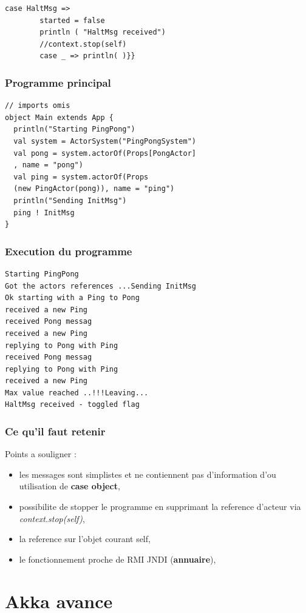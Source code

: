 \documentclass[xcolor=dvipsnames]{beamer}
\begin{document}
\begin{frame}[fragile]
 \lstset{frameround=fttt}
  \begin{lstlisting}[frame=trBL]
    case HaltMsg =>
        started = false
        println ( "HaltMsg received")
        //context.stop(self)
        case _ => println( )}}
  \end{lstlisting}
\end{frame}

\begin{frame}[fragile]
  \frametitle{Programme principal}
 \lstset{frameround=fttt}
  \begin{lstlisting}[frame=trBL]
// imports omis
object Main extends App {
  println("Starting PingPong")
  val system = ActorSystem("PingPongSystem")
  val pong = system.actorOf(Props[PongActor]
  , name = "pong")
  val ping = system.actorOf(Props
  (new PingActor(pong)), name = "ping")
  println("Sending InitMsg")
  ping ! InitMsg
}
\end{lstlisting}
\end{frame}

\begin{frame}[fragile]
  \frametitle{Execution du programme}
  \begin{lstlisting}[frame=trBL]
Starting PingPong
Got the actors references ...Sending InitMsg
Ok starting with a Ping to Pong
received a new Ping
received Pong messag
received a new Ping
replying to Pong with Ping
received Pong messag
replying to Pong with Ping
received a new Ping
Max value reached ..!!!Leaving...
HaltMsg received - toggled flag
\end{lstlisting}
\end{frame}

 \begin{frame}
   \frametitle{Ce qu'il faut retenir}
   Points a souligner :
   \begin{itemize}
   \item les messages sont simplistes et ne contiennent pas d'information d'ou utilisation de \textbf{case object},
   \item  possibilite de stopper le programme en supprimant la reference d'acteur via \textit{context.stop(self)},
   \item la reference sur l'objet courant self,
   \item le fonctionnement proche de RMI \/JNDI (\textbf{annuaire}),
   \end{itemize}
 \end{frame}

\section{Akka avance}
\end{document}
